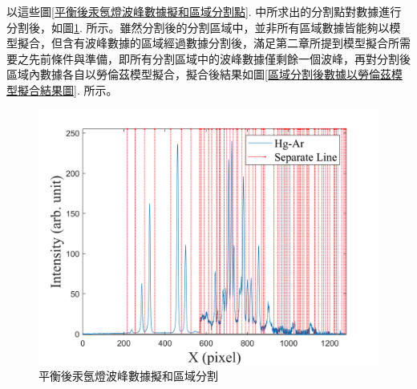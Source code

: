 \par
以這些圖\ref{平衡後汞氬燈波峰數據擬和區域分割點}. 中所求出的分割點對數據進行分割後，如圖\ref{平衡後汞氬燈波峰數據擬和區域分割}. 所示。雖然分割後的分割區域中，並非所有區域數據皆能夠以模型擬合，但含有波峰數據的區域經過數據分割後，滿足第二章所提到模型擬合所需要之先前條件與準備，即所有分割區域中的波峰數據僅剩餘一個波峰，再對分割後區域內數據各自以勞倫茲模型擬合\cite{Lorentz-0}，擬合後結果如圖\ref{區域分割後數據以勞倫茲模型擬合結果圖}. 所示。
\begin{figure}[H] %
	\centering %
	\includegraphics[width=14.5cm]{figures/combine_sep_line600.png} %
	\caption{平衡後汞氬燈波峰數據擬和區域分割} %
	\label{平衡後汞氬燈波峰數據擬和區域分割} %
\end{figure}

